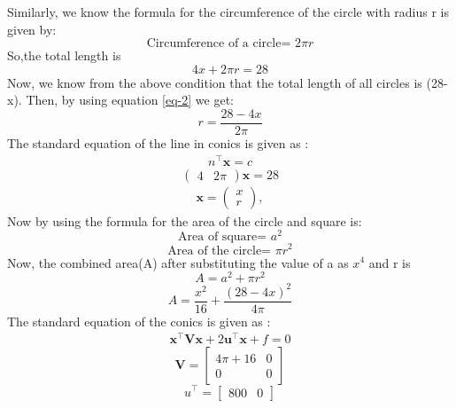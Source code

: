 \documentclass[journal,12pt,twocolumn]{IEEEtran}
\let\vec\mathbf
\newcommand{\myvec}[1]{\ensuremath{\begin{pmatrix}#1\end{pmatrix}}}
\begin{document}
Similarly, we know the formula for the circumference of the circle with radius r is given by:
\begin{equation}
\text{Circumference of a circle= }2\pi r
\label{eq-2}
\end{equation} 
So,the total length is \\
\begin{equation}
  4x + 2\pi r = 28
  \end{equation}
Now, we know from the above condition that the total length of all circles is (28-x).
Then, by using equation \ref{eq-2} we get:
\begin{equation}
r=\frac{28-4x}{2\pi}
\end{equation}
The standard equation of the line in conics is given as :
\begin{align}
n^\top \vec{x} = c
\end{align}
\begin{equation}
\begin{pmatrix}4 & 2\pi\end{pmatrix}  \vec{x} = 28
\end{equation}
\begin{align}
\vec{x}  = \myvec{x\\r},
\end{align}
Now by using the formula for the area of the circle and square is:
\begin{equation}
\text{Area of square= }a^2
\end{equation}
\begin{equation}
\text{Area of the circle= }\pi r^2
\end{equation}
Now, the combined area(A) after substituting the value of a as $x^4$ and r is
\begin{equation}
A=a^2+\pi r^2
\end{equation}
\begin{equation}
A = \frac{x^2}{16} + \frac{(28-4x)^2}{4\pi}
\end{equation}
The standard equation of the conics is given as :
\begin{align}
\vec{x}^{\top}\vec{V}\vec{x}+2\vec{u}^{\top}\vec{x}+f=0
\end{align}
\begin{equation}
\vec{V} = \begin{bmatrix}
4\pi+16 & 0 \\
0 & 0
\end{bmatrix}
\end{equation}
\begin{equation}
u^\top = \begin{bmatrix}
800 & 0
\end{bmatrix}
\end{equation}
\end{document}
